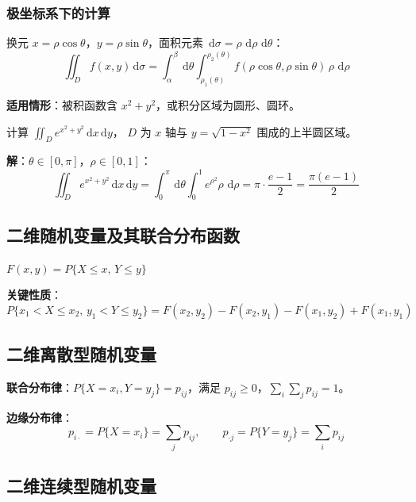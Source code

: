 \documentclass[12pt, a4paper]{article}
\newcommand{\dif}{\,\mathrm{d}}
\begin{document}
\subsubsection{极坐标系下的计算}

换元 $x=\rho\cos\theta$，$y=\rho\sin\theta$，面积元素 $\dif\sigma=\rho\,\dif\rho\,\dif\theta$：
\[
    \iint_D f(x,y)\dif\sigma
    = \int_\alpha^\beta\dif\theta \int_{\rho_1(\theta)}^{\rho_2(\theta)}
    f(\rho\cos\theta,\rho\sin\theta)\,\rho\,\dif\rho
\]

\textbf{适用情形}：被积函数含 $x^2+y^2$，或积分区域为圆形、圆环。

\begin{tcolorbox}[exbox, title={极坐标换元例题}]
    计算 $\displaystyle\iint_D e^{x^2+y^2}\dif x\dif y$，
    $D$ 为 $x$ 轴与 $y=\sqrt{1-x^2}$ 围成的上半圆区域。

    \textbf{解}：$\theta\in[0,\pi]$，$\rho\in[0,1]$：
    \[
        \iint_D e^{x^2+y^2}\dif x\dif y
        = \int_0^\pi\dif\theta\int_0^1 e^{\rho^2}\rho\,\dif\rho
        = \pi\cdot\frac{e-1}{2} = \frac{\pi(e-1)}{2}
    \]
\end{tcolorbox}

\subsection{二维随机变量及其联合分布函数}

\begin{tcolorbox}[defbox, title={联合分布函数}]
    $F(x,y)=P\{X\le x,\,Y\le y\}$

    \textbf{关键性质}：
    \[
        P\{x_1<X\le x_2,\,y_1<Y\le y_2\}
        = F(x_2,y_2)-F(x_2,y_1)-F(x_1,y_2)+F(x_1,y_1)
    \]
\end{tcolorbox}

\subsection{二维离散型随机变量}

\textbf{联合分布律}：$P\{X=x_i,Y=y_j\}=p_{ij}$，满足 $p_{ij}\ge 0$，$\sum_i\sum_j p_{ij}=1$。

\textbf{边缘分布律}：
\[
    p_{i\cdot}=P\{X=x_i\}=\sum_j p_{ij}, \qquad
    p_{\cdot j}=P\{Y=y_j\}=\sum_i p_{ij}
\]

\subsection{二维连续型随机变量}
\end{document}
